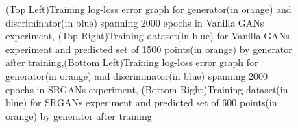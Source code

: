 \documentclass[10pt,journal,compsoc]{IEEEtran}
\begin{document}
\begin{figure}[t]
\quad\quad\hspace{-6pt}
\hfil
{}
\quad\quad\hspace{-6pt}
\caption{(Top Left)Training log-loss error graph for generator(in orange) and discriminator(in blue) spanning 2000 epochs in Vanilla GANs experiment,  (Top Right)Training dataset(in blue) for Vanilla GANs experiment and predicted set of 1500 points(in orange) by generator after training,(Bottom Left)Training log-loss error graph for generator(in orange) and discriminator(in blue) spanning 2000 epochs in SRGANs experiment,  (Bottom Right)Training dataset(in blue) for SRGANs experiment and predicted set of 600 points(in orange) by generator after training}
\label{data1}
\end{figure}
\end{document}
